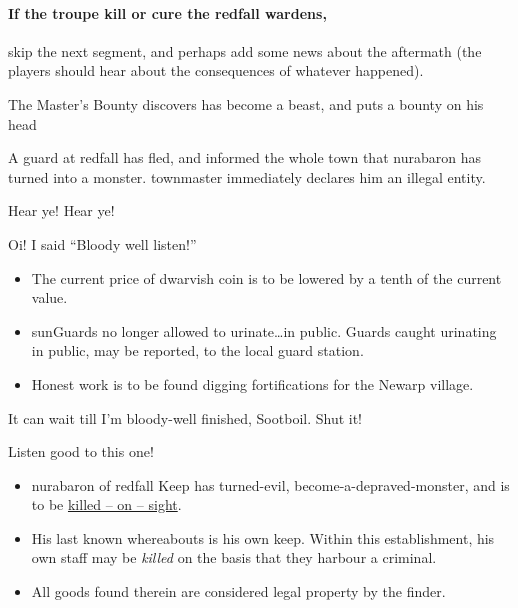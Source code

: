 \paragraph{If the troupe kill or cure the \gls{redfall} \glspl{warden},}
skip the next \gls{segment}, and perhaps add some news about the aftermath (the players should hear about the consequences of whatever happened).

{The Master's Bounty}%
{ discovers  has become a beast, and puts a bounty on his head}%
\label{mastersBounty}

A guard at \gls{redfall} has fled, and informed the whole town that \gls{nurabaron} has turned into a monster.
\Gls{townmaster} immediately declares him an illegal entity.

\begin{speechtext}
    Hear ye! Hear ye!

    Oi! I said ``Bloody well listen!''

    \begin{itemize}
      \item
      The current price of dwarvish coin is to be lowered by a tenth of the current value.
      \item
      \Glspl{sunGuard} no longer allowed to urinate\ldots in public.
      Guards caught urinating in public, may be reported, to the local {\footnotesize guard station}.
      \item
      Honest work is to be found digging fortifications for the Newarp \gls{village}.
    \end{itemize}

    It can wait till I'm bloody-well finished, Sootboil.
    Shut it!

    Listen good to this one!
    \begin{itemize}
      \item
      \Gls{nurabaron} of \gls{redfall} Keep has turned-evil, become-a-depraved-monster, and is to be \underline{\large killed -- on -- sight}.
      \item
      His last known whereabouts is his own keep.
      Within this establishment, his own staff may be \emph{killed} on the basis that they harbour a criminal.
      \item
      All goods found therein are considered legal property by the finder.
    \end{itemize}
\end{speechtext}

